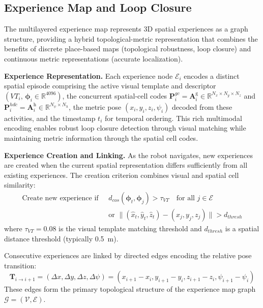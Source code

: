 \subsection{Experience Map and Loop Closure}

The multilayered experience map represents 3D spatial experiences as a graph structure, providing a hybrid topological-metric representation that combines the benefits of discrete place-based maps (topological robustness, loop closure) and continuous metric representations (accurate localization).

\textbf{Experience Representation.} Each experience node $\mathcal{E}_i$ encodes a distinct spatial episode comprising the active visual template and descriptor $(VT_i,\,\boldsymbol{\phi}_i\in\mathbb{R}^{4096})$, the concurrent spatial-cell codes $\mathbf{P}^{gc}_i=\mathbf{A}^\mathrm{g}_i\in\mathbb{R}^{N_x\times N_y\times N_z}$ and $\mathbf{P}^{hdc}_i=\mathbf{A}^\mathrm{h}_i\in\mathbb{R}^{N_\psi\times N_h}$, the metric pose $(x_i, y_i, z_i, \psi_i)$ decoded from these activities, and the timestamp $t_i$ for temporal ordering.
This rich multimodal encoding enables robust loop closure detection through visual matching while maintaining metric information through the spatial cell codes.

\textbf{Experience Creation and Linking.} As the robot navigates, new experiences are created when the current spatial representation differs sufficiently from all existing experiences. The creation criterion combines visual and spatial cell similarity:
\begin{equation}
    \begin{aligned}
        \text{Create new experience if }\; & d_{cos}(\boldsymbol{\phi}_t, \boldsymbol{\phi}_j) > \tau_{VT} \quad \text{for all } j \in \mathcal{E} \\
                                           & \text{or } \lVert (\hat{x}_t, \hat{y}_t, \hat{z}_t) - (x_j, y_j, z_j) \rVert > d_{thresh}
    \end{aligned}
\end{equation}
where $\tau_{VT} = 0.08$ is the visual template matching threshold and $d_{thresh}$ is a spatial distance threshold (typically 0.5~m).

Consecutive experiences are linked by directed edges encoding the relative pose transition:
\begin{equation}
    \mathbf{T}_{i \to i+1} = (\Delta x, \Delta y, \Delta z, \Delta \psi) = (x_{i+1} - x_i, y_{i+1} - y_i, z_{i+1} - z_i, \psi_{i+1} - \psi_i)
\end{equation}
These edges form the primary topological structure of the experience map graph $\mathcal{G} = (\mathcal{V}, \mathcal{E})$.

